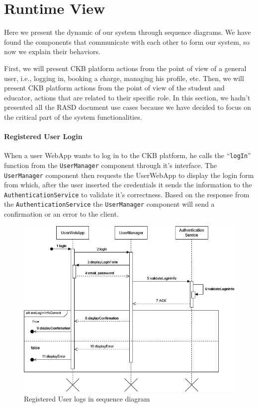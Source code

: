 \section{Runtime View}
\label{sec:runtime_view}%
Here we present the dynamic of our system through sequence diagrams.
We have found the components that communicate with each other to form our system, so now we explain their behaviors.

First, we will present CKB platform actions from the point of view of a general user, i.e., logging in, booking a charge, managing his profile, etc.
Then, we will present CKB platform actions from the point of view of the student and educator, actions that are related to their specific role.
In this section, we hadn't presented all the RASD document use cases because we have decided to focus on the critical part of the system functionalities.

\paragraph{Registered User Login}
When a user WebApp wants to log in to the CKB platform, he calls the ``\verb|logIn|'' function from the \verb|UserManager| component through it's interface.
The \verb|UserManager| component then requests the UserWebApp to display the login form from which, after the user inserted the credentials it sends the information to the
\verb|AuthenticationService| to validate it's correctness. Based on the response from the \verb|AuthenticationService| the \verb|UserManager| component will send a confirmation or an error to the client.

\begin{figure}[H]
    \begin{center}
        \includegraphics[width=\linewidth]{Images/sequence/Sd_login.png}
        \caption{Registered User logs in sequence diagram}
        \label{fig:user_logs_in}
    \end{center}
\end{figure}

